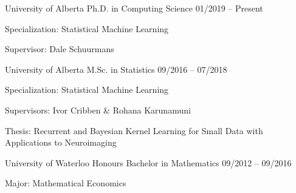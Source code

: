 \begin{cventries}
  \cventry
    {University of Alberta}
    {Ph.D. in Computing Science}
    {01/2019 -- Present}
    {
      \begin{cvitems}
        \item {Specialization: Statistical Machine Learning}
        \item {Supervisor: Dale Schuurmans}
      \end{cvitems}
    }

  \cventry
    {University of Alberta}
    {M.Sc. in Statistics}
    {09/2016 -- 07/2018}
    {
      \begin{cvitems}
        \item {Specialization: Statistical Machine Learning}
        \item {Supervisors: Ivor Cribben \& Rohana Karunamuni}
        \item {Thesis: Recurrent and Bayesian Kernel Learning for Small Data with Applications to Neuroimaging}
      \end{cvitems}
    }
  \cventry
    {University of Waterloo}
    {Honours Bachelor in Mathematics}
    {09/2012 -- 09/2016}
    {
      \begin{cvitems}
        \item Major: Mathematical Economics
      \end{cvitems}
    }
\end{cventries}

